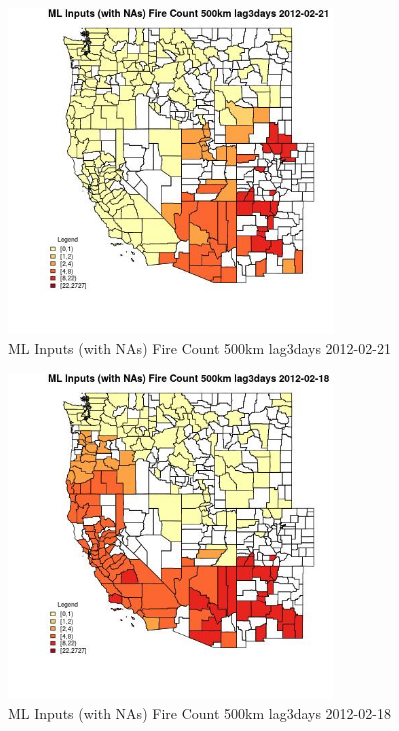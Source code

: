 \begin{figure} 
\centering  
\includegraphics[width=0.77\textwidth]{Code_Outputs/Report_ML_input_PM25_Step4_part_f_de_duplicated_aves_prioritize_24hr_obswNAs_CountyFire_Count_500km_lag3daysMean2012-02-21.jpg} 
\caption{\label{fig:Report_ML_input_PM25_Step4_part_f_de_duplicated_aves_prioritize_24hr_obswNAsCountyFire_Count_500km_lag3daysMean2012-02-21}ML Inputs (with NAs) Fire Count 500km lag3days 2012-02-21} 
\end{figure} 
 

\begin{figure} 
\centering  
\includegraphics[width=0.77\textwidth]{Code_Outputs/Report_ML_input_PM25_Step4_part_f_de_duplicated_aves_prioritize_24hr_obswNAs_CountyFire_Count_500km_lag3daysMean2012-02-18.jpg} 
\caption{\label{fig:Report_ML_input_PM25_Step4_part_f_de_duplicated_aves_prioritize_24hr_obswNAsCountyFire_Count_500km_lag3daysMean2012-02-18}ML Inputs (with NAs) Fire Count 500km lag3days 2012-02-18} 
\end{figure} 
 


